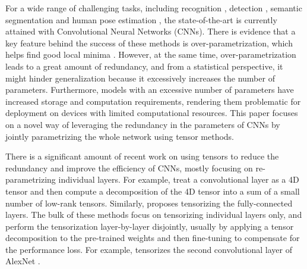 \documentclass[10pt,twocolumn,letterpaper]{article}
\begin{document}
For a wide range of challenging tasks, including recognition \cite{krizhevsky2012imagenet, simonyan2014very,he2016deep}, detection \cite{ren2015faster}, semantic segmentation \cite{long2015fully, he2017mask} and human pose estimation \cite{newell2016stacked}, the state-of-the-art is currently attained with Convolutional Neural Networks (CNNs). There is evidence that a key feature behind the success of these methods is over-parametrization, which helps find good local minima \cite{du2018power, soltanolkotabi2018theoretical}. However, at the same time, over-parametrization leads to a great amount of redundancy, and from a statistical perspective, it might hinder generalization because it excessively increases the number of parameters. Furthermore, models with an excessive number of parameters have increased storage and computation requirements, rendering them problematic for deployment on devices with limited computational resources. This paper focuses on a novel way of leveraging the redundancy in the parameters of CNNs by jointly parametrizing the whole network using tensor methods. 

There is a significant amount of recent work on using tensors to reduce the redundancy and improve the efficiency of CNNs, mostly focusing on re-parametrizing individual layers. For example, \cite{tai2015convolutional, yong2015compression} treat a convolutional layer as a 4D tensor and then compute a decomposition of the 4D tensor into a sum of a small number of low-rank tensors. Similarly, \cite{novikov2015tensorizing} proposes tensorizing the fully-connected layers. The bulk of these methods focus on tensorizing individual layers only, and perform the tensorization layer-by-layer disjointly, usually by applying a tensor decomposition to the pre-trained weights and then fine-tuning to compensate for the performance loss. For example, \cite{tai2015convolutional} tensorizes the second convolutional layer of AlexNet \cite{krizhevsky2012imagenet}. 
\end{document}
